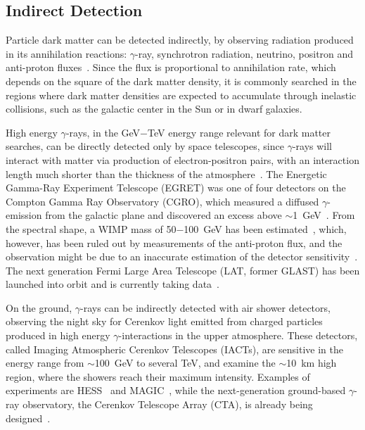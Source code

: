 \subsection{Indirect Detection}
\label{secIndirectDetection}

Particle dark matter can be detected indirectly, by observing radiation produced in its annihilation reactions: $\gamma$-ray, synchrotron radiation, neutrino, positron and anti-proton fluxes~\cite{BertoneHooper}. Since the flux is proportional to annihilation rate, which depends on the square of the dark matter density, it is commonly searched in the regions where dark matter densities are expected to accumulate through inelastic collisions, such as the galactic center in the Sun or in dwarf galaxies.

High energy $\gamma$-rays, in the GeV$-$TeV energy range relevant for dark matter searches, can be directly detected only by space telescopes, since $\gamma$-rays will interact with matter via production of electron-positron pairs, with an interaction length much shorter than the thickness of the atmosphere~\cite{IndirectDetection_gamma}. The Energetic Gamma-Ray Experiment Telescope (EGRET) was one of four detectors on the Compton Gamma Ray Observatory (CGRO), which measured a diffused $\gamma$-emission from the galactic plane and discovered an excess above $\sim$1~GeV~\cite{Indirectdetection_EGRETexcess}. From the spectral shape, a WIMP mass of 50$-$100~GeV has been estimated~\cite{IndirectDetection_EGRETinterpretation}, which, however, has been ruled out by measurements of the anti-proton flux, and the observation might  be due to an inaccurate estimation of the detector sensitivity~\cite{IndirectDetection_EGRETexplanation}. The next generation Fermi Large Area Telescope (LAT, former GLAST) has been launched into orbit and is currently taking data~\cite{IndirectDetection_Fermi}.

On the ground, $\gamma$-rays can be indirectly detected with air shower detectors, observing the night sky for Cerenkov light emitted from charged particles produced in high energy $\gamma$-interactions in the upper atmosphere. These detectors, called Imaging Atmospheric Cerenkov Telescopes (IACTs), are sensitive in the energy range from $\sim$100~GeV to several TeV, and examine the $\sim$10~km high region, where the showers reach their maximum intensity. Examples of experiments are HESS~\cite{IndirectDetection_HESS} and MAGIC~\cite{IndirectDetection_MAGIC}, while the next-generation ground-based $\gamma$-ray observatory, the Cerenkov Telescope Array (CTA), is already being designed~\cite{IndirectDetection_CTA}.

